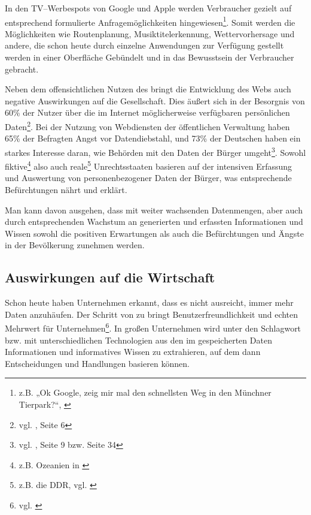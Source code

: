 In den TV--Werbespots von Google und Apple werden Verbraucher gezielt auf entsprechend formulierte Anfragemöglichkeiten hingewiesen\footnote{z.B. „Ok Google, zeig mir mal den schnellsten Weg in den Münchner Tierpark?“, \cite{okg:tierpark}}. Somit werden die Möglichkeiten wie Routenplanung, Musiktitelerkennung, Wettervorhersage und andere, die schon heute durch einzelne Anwendungen zur Verfügung gestellt werden in einer Oberfläche Gebündelt und in das Bewusstsein der Verbraucher gebracht.

\label{probleme}
Neben dem offensichtlichen Nutzen des  bringt die Entwicklung des Webs auch negative Auswirkungen auf die Gesellschaft. 
Dies äußert sich in der Besorgnis von 60\% der Nutzer über die im Internet möglicherweise verfügbaren persönlichen Daten\footnote{vgl. \cite{d21}, Seite 6}. Bei der Nutzung von Webdiensten der öffentlichen Verwaltung haben 65\% der Befragten Angst vor Datendiebstahl, und 73\% der Deutschen haben ein starkes Interesse daran, wie Behörden mit den Daten der Bürger umgeht\footnote{vgl. \cite{d21gov}, Seite 9 bzw. Seite 34}.  Sowohl fiktive\footnote{z.B. Ozeanien in \cite{orwell}} also auch reale\footnote{z.B. die DDR, vgl. \cite{wp:stasi}} Unrechtsstaaten basieren auf der intensiven Erfassung und Auswertung von personenbezogener Daten der Bürger, was entsprechende Befürchtungen nährt und erklärt.

Man kann davon ausgehen, dass mit weiter wachsenden Datenmengen, aber auch durch entsprechenden Wachstum an generierten und erfassten Informationen und Wissen sowohl die positiven Erwartungen als auch die Befürchtungen und Ängste in der Bevölkerung zunehmen werden.

\subsection{Auswirkungen auf die Wirtschaft}

Schon heute haben Unternehmen erkannt, dass es nicht ausreicht, immer mehr Daten anzuhäufen. Der Schritt von  zu  bringt Benutzerfreundlichkeit und echten Mehrwert für Unternehmen\footnote{vgl. \cite{odnsbi}}. In großen Unternehmen wird unter den Schlagwort  bzw.  mit unterschiedlichen Technologien aus den im  gespeicherten Daten Informationen und informatives Wissen zu extrahieren, auf dem dann Entscheidungen und Handlungen basieren können. 

